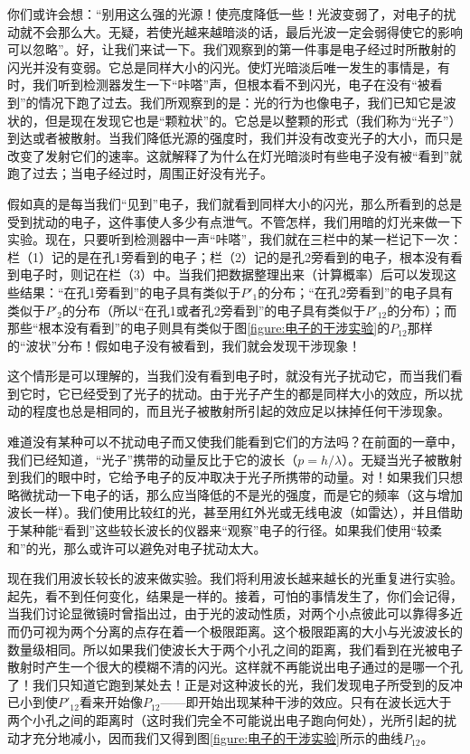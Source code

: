 你们或许会想：“别用这么强的光源！使亮度降低一些！光波变弱了，对电子的扰动就不会那么大。无疑，若使光越来越暗淡的话，最后光波一定会弱得使它的影响可以忽略”。好，让我们来试一下。我们观察到的第一件事是电子经过时所散射的闪光并没有变弱。它总是同样大小的闪光。使灯光暗淡后唯一发生的事情是，有时，我们听到检测器发生一下“咔嗒”声，但根本看不到闪光，电子在没有“被看到”的情况下跑了过去。我们所观察到的是：光的行为也像电子，我们已知它是波状的，但是现在发现它也是“颗粒状”的。它总是以整颗的形式（我们称为“光子”）到达或者被散射。当我们降低光源的强度时，我们并没有改变光子的大小，而只是改变了发射它们的速率。这就解释了为什么在灯光暗淡时有些电子没有被“看到”就跑了过去；当电子经过时，周围正好没有光子。

假如真的是每当我们“见到”电子，我们就看到同样大小的闪光，那么所看到的总是受到扰动的电子，这件事使人多少有点泄气。不管怎样，我们用暗的灯光来做一下实验。现在，只要听到检测器中一声“咔嗒”，我们就在三栏中的某一栏记下一次：栏（1）记的是在孔1旁看到的电子；栏（2）记的是孔2旁看到的电子，根本没有看到电子时，则记在栏（3）中。当我们把数据整理出来（计算概率）后可以发现这些结果：“在孔1旁看到”的电子具有类似于$P'_1$的分布；“在孔2旁看到”的电子具有类似于$P'_2$的分布（所以“在孔1或者孔2旁看到”的电子具有类似于$P'_{12}$的分布）；而那些“根本没有看到”的电子则具有类似于图\ref{figure:电子的干涉实验}的$P_{12}$那样的“波状”分布！假如电子没有被看到，我们就会发现干涉现象！

这个情形是可以理解的，当我们没有看到电子时，就没有光子扰动它，而当我们看到它时，它已经受到了光子的扰动。由于光子产生的都是同样大小的效应，所以扰动的程度也总是相同的，而且光子被散射所引起的效应足以抹掉任何干涉现象。

难道没有某种可以不扰动电子而又使我们能看到它们的方法吗？在前面的一章中，我们已经知道，“光子”携带的动量反比于它的波长（$p=h/\lambda$）。无疑当光子被散射到我们的眼中时，它给予电子的反冲取决于光子所携带的动量。对！如果我们只想略微扰动一下电子的话，那么应当降低的不是光的强度，而是它的频率（这与增加波长一样）。我们使用比较红的光，甚至用红外光或无线电波（如雷达），并且借助于某种能“看到”这些较长波长的仪器来“观察”电子的行径。如果我们使用“较柔和”的光，那么或许可以避免对电子扰动太大。

现在我们用波长较长的波来做实验。我们将利用波长越来越长的光重复进行实验。起先，看不到任何变化，结果是一样的。接着，可怕的事情发生了，你们会记得，当我们讨论显微镜时曾指出过，由于光的波动性质，对两个小点彼此可以靠得多近而仍可视为两个分离的点存在着一个极限距离。这个极限距离的大小与光波波长的数量级相同。所以如果我们使波长大于两个小孔之间的距离，我们看到在光被电子散射时产生一个很大的模糊不清的闪光。这样就不再能说出电子通过的是哪一个孔了！我们只知道它跑到某处去！正是对这种波长的光，我们发现电子所受到的反冲已小到使$P'_{12}$看来开始像$P_{12}$——即开始出现某种干涉的效应。只有在波长远大于两个小孔之间的距离时（这时我们完全不可能说出电子跑向何处），光所引起的扰动才充分地减小，因而我们又得到图\ref{figure:电子的干涉实验}所示的曲线$P_{12}$。


